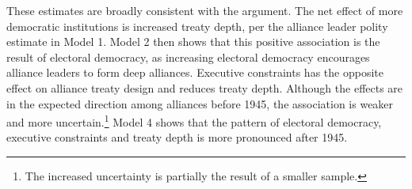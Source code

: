\documentclass[12pt]{article}
\begin{document}
These estimates are broadly consistent with the argument. 
The net effect of more democratic institutions is increased treaty depth, per the alliance leader polity estimate in Model 1. 
Model 2 then shows that this positive association is the result of electoral democracy, as increasing electoral democracy encourages alliance leaders to form deep alliances. 
Executive constraints has the opposite effect on alliance treaty design and reduces treaty depth. 
Although the effects are in the expected direction among alliances before 1945, the association is weaker and more uncertain.\footnote{The increased uncertainty is partially the result of a smaller sample.} 
Model 4 shows that the pattern of electoral democracy, executive constraints and treaty depth is more pronounced after 1945. 


\begin{table}[!htbp] \centering 
\end{table}
\end{document}
